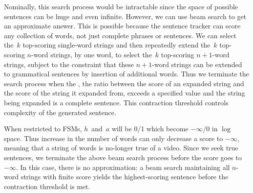 Nominally, this search process would be intractable since the space of possible
sentences can be huge and even infinite.
%
However, we can use beam search to get an approximate answer.
%
This is possible because the sentence tracker can score any collection of
words, not just complete phrases or sentences.
%
We can select the~$k$ top-scoring single-word strings and then repeatedly
extend the~$k$ top-scoring $n$-word strings, by one word, to select the~$k$
top-scoring $n+1$-word strings, subject to the constraint that these $n+1$-word
strings can be extended to grammatical sentences by insertion of additional
words.
%
Thus we terminate the search process when the ,
the ratio between the score of an expanded string and the score of the string
it expanded from, exceeds a specified value and the string being expanded is a
complete sentence.
%
This contraction threshold controls complexity of the generated sentence.

When restricted to FSMs, $h$~and~$a$ will be 0/1 which become $-\infty$/0
in $\log$ space.
%
Thus increase in the number of words can only decrease a score to $-\infty$,
meaning that a string of words is no-longer true of a video.
%
Since we seek true sentences, we terminate the above beam search process before
the score goes to $-\infty$.
%
In this case, there is no approximation: a beam search maintaining all $n$-word
strings with finite score yields the highest-scoring sentence before the
contraction threshold is met.


